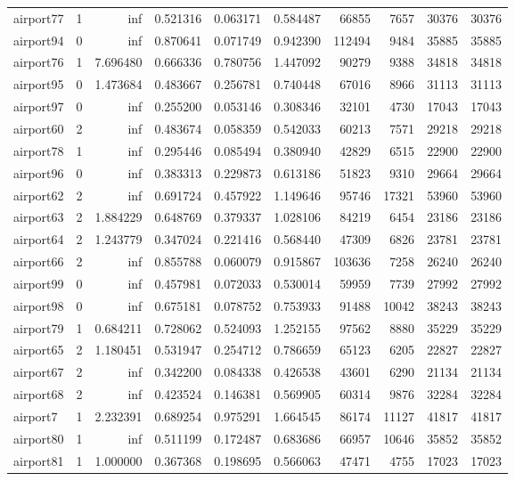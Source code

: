 \documentclass[../../../thesis.tex]{subfiles}
\begin{document}
\begin{longtable}{|l|r|r|r|r|r|r|r|r|r|}
airport77 & 1 & inf & 0.521316 & 0.063171 & 0.584487 & 66855 & 7657 & 30376 & 30376 \\
airport94 & 0 & inf & 0.870641 & 0.071749 & 0.942390 & 112494 & 9484 & 35885 & 35885 \\
airport76 & 1 & 7.696480 & 0.666336 & 0.780756 & 1.447092 & 90279 & 9388 & 34818 & 34818 \\
airport95 & 0 & 1.473684 & 0.483667 & 0.256781 & 0.740448 & 67016 & 8966 & 31113 & 31113 \\
airport97 & 0 & inf & 0.255200 & 0.053146 & 0.308346 & 32101 & 4730 & 17043 & 17043 \\
airport60 & 2 & inf & 0.483674 & 0.058359 & 0.542033 & 60213 & 7571 & 29218 & 29218 \\
airport78 & 1 & inf & 0.295446 & 0.085494 & 0.380940 & 42829 & 6515 & 22900 & 22900 \\
airport96 & 0 & inf & 0.383313 & 0.229873 & 0.613186 & 51823 & 9310 & 29664 & 29664 \\
airport62 & 2 & inf & 0.691724 & 0.457922 & 1.149646 & 95746 & 17321 & 53960 & 53960 \\
airport63 & 2 & 1.884229 & 0.648769 & 0.379337 & 1.028106 & 84219 & 6454 & 23186 & 23186 \\
airport64 & 2 & 1.243779 & 0.347024 & 0.221416 & 0.568440 & 47309 & 6826 & 23781 & 23781 \\
airport66 & 2 & inf & 0.855788 & 0.060079 & 0.915867 & 103636 & 7258 & 26240 & 26240 \\
airport99 & 0 & inf & 0.457981 & 0.072033 & 0.530014 & 59959 & 7739 & 27992 & 27992 \\
airport98 & 0 & inf & 0.675181 & 0.078752 & 0.753933 & 91488 & 10042 & 38243 & 38243 \\
airport79 & 1 & 0.684211 & 0.728062 & 0.524093 & 1.252155 & 97562 & 8880 & 35229 & 35229 \\
airport65 & 2 & 1.180451 & 0.531947 & 0.254712 & 0.786659 & 65123 & 6205 & 22827 & 22827 \\
airport67 & 2 & inf & 0.342200 & 0.084338 & 0.426538 & 43601 & 6290 & 21134 & 21134 \\
airport68 & 2 & inf & 0.423524 & 0.146381 & 0.569905 & 60314 & 9876 & 32284 & 32284 \\
airport7 & 1 & 2.232391 & 0.689254 & 0.975291 & 1.664545 & 86174 & 11127 & 41817 & 41817 \\
airport80 & 1 & inf & 0.511199 & 0.172487 & 0.683686 & 66957 & 10646 & 35852 & 35852 \\
airport81 & 1 & 1.000000 & 0.367368 & 0.198695 & 0.566063 & 47471 & 4755 & 17023 & 17023 \\

\end{longtable}
\end{document}
